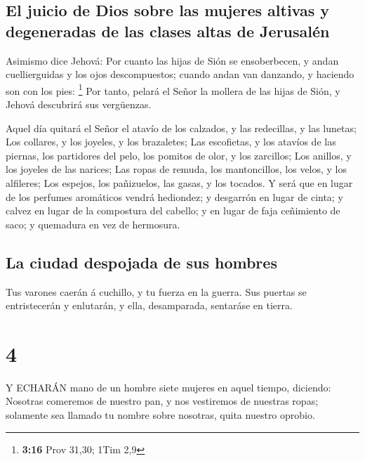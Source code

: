 \hypertarget{el-juicio-de-dios-sobre-las-mujeres-altivas-y-degeneradas-de-las-clases-altas-de-jerusaluxe9n}{%
\subsection{El juicio de Dios sobre las mujeres altivas y degeneradas de
las clases altas de
Jerusalén}\label{el-juicio-de-dios-sobre-las-mujeres-altivas-y-degeneradas-de-las-clases-altas-de-jerusaluxe9n}}

 Asimismo dice Jehová: Por cuanto las hijas de Sión se
ensoberbecen, y andan cuellierguidas y los ojos descompuestos; cuando
andan van danzando, y haciendo son con los pies: \footnote{\textbf{3:16}
  Prov 31,30; 1Tim 2,9}  Por tanto, pelará el Señor la
mollera de las hijas de Sión, y Jehová descubrirá sus vergüenzas.

 Aquel día quitará el Señor el atavío de los calzados, y
las redecillas, y las lunetas;  Los collares, y los
joyeles, y los brazaletes;  Las escofietas, y los atavíos
de las piernas, los partidores del pelo, los pomitos de olor, y los
zarcillos;  Los anillos, y los joyeles de las narices;
 Las ropas de remuda, los mantoncillos, los velos, y los
alfileres;  Los espejos, los pañizuelos, las gasas, y los
tocados.  Y será que en lugar de los perfumes aromáticos
vendrá hediondez; y desgarrón en lugar de cinta; y calvez en lugar de la
compostura del cabello; y en lugar de faja ceñimiento de saco; y
quemadura en vez de hermosura.

\hypertarget{la-ciudad-despojada-de-sus-hombres}{%
\subsection{La ciudad despojada de sus
hombres}\label{la-ciudad-despojada-de-sus-hombres}}

 Tus varones caerán á cuchillo, y tu fuerza en la guerra.
 Sus puertas se entristecerán y enlutarán, y ella,
desamparada, sentaráse en tierra.

\hypertarget{section-3}{%
\section{4}\label{section-3}}

 Y ECHARÁN mano de un hombre siete mujeres en aquel tiempo,
diciendo: Nosotras comeremos de nuestro pan, y nos vestiremos de
nuestras ropas; solamente sea llamado tu nombre sobre nosotras, quita
nuestro oprobio.

